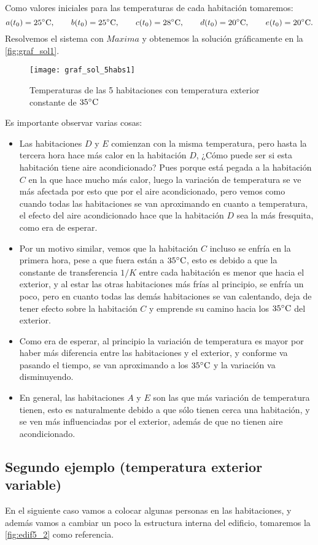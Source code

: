 Como valores iniciales para las temperaturas de cada habitación tomaremos:
\begin{equation}
	a(t_0) = 25 \celsius, \qquad b(t_0) = 25 \celsius, \qquad c(t_0) = 28 \celsius, \qquad d(t_0) = 20 \celsius, \qquad e(t_0) = 20 \celsius.
\end{equation}
Resolvemos el sistema con $Maxima$ y obtenemos la solución gráficamente en la \autoref{fig:graf_sol1}.
\begin{figure}[h!]
	\centering
	\texttt{[image: graf\_sol\_5habs1]}
	\caption{Temperaturas de las 5 habitaciones con temperatura exterior constante de $35 \celsius$}
	\label{fig:graf_sol1}
\end{figure}
Es importante observar varias cosas:
\begin{itemize}
	\item Las habitaciones $D$ y $E$ comienzan con la misma temperatura, pero hasta la tercera hora hace más calor en la habitación $D$, ¿Cómo puede ser si esta habitación tiene aire acondicionado? Pues porque está pegada a la habitación $C$ en la que hace mucho más calor, luego la variación de temperatura se ve más afectada por esto que por el aire acondicionado, pero vemos como cuando todas las habitaciones se van aproximando en cuanto a temperatura, el efecto del aire acondicionado hace que la habitación $D$ sea la más fresquita, como era de esperar.
	\item Por un motivo similar, vemos que la habitación $C$ incluso se enfría en la primera hora, pese a que fuera están a $35 \celsius$, esto es debido a que la constante de transferencia $1/K$ entre cada habitación es menor que hacia el exterior, y al estar las otras habitaciones más frías al principio, se enfría un poco, pero en cuanto todas las demás habitaciones se van calentando, deja de tener efecto sobre la habitación $C$ y emprende su camino hacia los $35 \celsius$ del exterior.
	\item Como era de esperar, al principio la variación de temperatura es mayor por haber más diferencia entre las habitaciones y el exterior, y conforme va pasando el tiempo, se van aproximando a los $35 \celsius$ y la variación va disminuyendo.
	\item En general, las habitaciones $A$ y $E$ son las que más variación de temperatura tienen, esto es naturalmente debido a que sólo tienen cerca una habitación, y se ven más influenciadas por el exterior, además de que no tienen aire acondicionado.
\end{itemize}
\subsection{Segundo ejemplo (temperatura exterior variable)}
En el siguiente caso vamos a colocar algunas personas en las habitaciones, y además vamos a cambiar un poco la estructura interna del edificio, tomaremos la \autoref{fig:edif5_2} como referencia.

